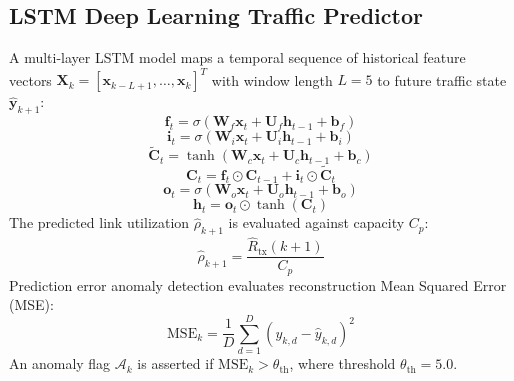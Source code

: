 \documentclass[conference]{IEEEtran}
\begin{document}
\subsection{LSTM Deep Learning Traffic Predictor}
A multi-layer LSTM model maps a temporal sequence of historical feature vectors $\mathbf{X}_k = [\mathbf{x}_{k-L+1}, \dots, \mathbf{x}_k]^T$ with window length $L=5$ to future traffic state $\hat{\mathbf{y}}_{k+1}$:
\begin{equation}
\mathbf{f}_t = \sigma(\mathbf{W}_f \mathbf{x}_t + \mathbf{U}_f \mathbf{h}_{t-1} + \mathbf{b}_f)
\end{equation}
\begin{equation}
\mathbf{i}_t = \sigma(\mathbf{W}_i \mathbf{x}_t + \mathbf{U}_i \mathbf{h}_{t-1} + \mathbf{b}_i)
\end{equation}
\begin{equation}
\tilde{\mathbf{C}}_t = \tanh(\mathbf{W}_c \mathbf{x}_t + \mathbf{U}_c \mathbf{h}_{t-1} + \mathbf{b}_c)
\end{equation}
\begin{equation}
\mathbf{C}_t = \mathbf{f}_t \odot \mathbf{C}_{t-1} + \mathbf{i}_t \odot \tilde{\mathbf{C}}_t
\end{equation}
\begin{equation}
\mathbf{o}_t = \sigma(\mathbf{W}_o \mathbf{x}_t + \mathbf{U}_o \mathbf{h}_{t-1} + \mathbf{b}_o)
\end{equation}
\begin{equation}
\mathbf{h}_t = \mathbf{o}_t \odot \tanh(\mathbf{C}_t)
\end{equation}
The predicted link utilization $\hat{\rho}_{k+1}$ is evaluated against capacity $C_p$:
\begin{equation}
\hat{\rho}_{k+1} = \frac{\hat{R}_{\text{tx}}(k+1)}{C_p}
\end{equation}
Prediction error anomaly detection evaluates reconstruction Mean Squared Error (MSE):
\begin{equation}
\text{MSE}_k = \frac{1}{D}\sum_{d=1}^D (y_{k,d} - \hat{y}_{k,d})^2
\end{equation}
An anomaly flag $\mathcal{A}_k$ is asserted if $\text{MSE}_k > \theta_{\text{th}}$, where threshold $\theta_{\text{th}} = 5.0$.
\end{document}
